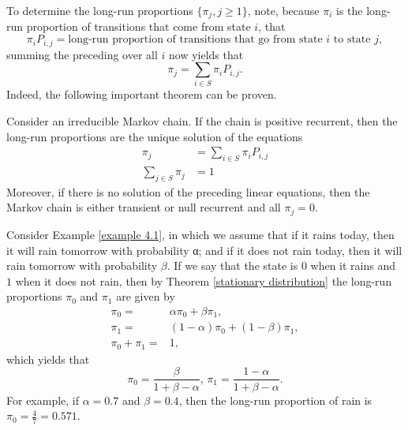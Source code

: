 To determine the long-run proportions $\{\pi_j , j \ge 1\}$, note, because $\pi_i$ is the long-run proportion of transitions that come from state $i$, that
$$
\pi_i P_{i,j} = \text{long-run proportion of transitions that go from state $i$ to state $j$},
$$
summing the preceding over all $i$ now yields that
$$
\pi_j = \sum_{i \in S}\pi_i P_{i,j}.
$$
Indeed, the following important theorem can be proven.

\begin{theorem}\label{stationary distribution}
    Consider an irreducible Markov chain. If the chain is positive recurrent, then the long-run proportions are the unique solution of the equations
    \begin{align*}
        \pi_j & = \sum_{i \in S} \pi_i P_{i, j} \\ 
        \sum_{j \in S} \pi_j & = 1
    \end{align*}
    Moreover, if there is no solution of the preceding linear equations, then the Markov chain is either transient or null recurrent and all $\pi_j = 0$.
\end{theorem}



\begin{example}\label{example 4.22}
    Consider Example \ref{example 4.1}, in which we assume that if it rains today, then
    it will rain tomorrow with probability α; and if it does not rain today, then it will rain tomorrow with probability $\beta$. If we say that the state is $0$ when it rains and $1$ when it
    does not rain, then by Theorem \ref{stationary distribution} the long-run proportions $\pi_0$ and $\pi_1$ are given by
    \begin{align*}
        \pi_0 = & \alpha \pi_0 + \beta \pi_1, \\ 
        \pi_1 = & (1- \alpha)\pi_0 + (1 - \beta) \pi_1, \\ 
        \pi_0 + \pi_1 = & 1,
    \end{align*}
    which yields that 
    $$
    \pi_0 = \frac{\beta}{1+\beta - \alpha}, \, \pi_1 = \frac{1 - \alpha}{1 + \beta - \alpha}.
    $$
    For example, if $\alpha = 0.7$ and $\beta = 0.4$, then the long-run proportion of rain is $\pi_0 = \frac{4}{7} = 0.571$.
\end{example}

